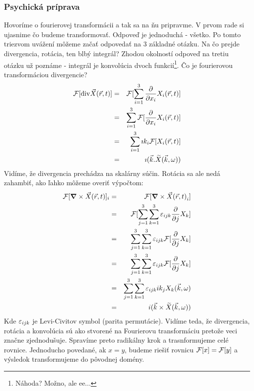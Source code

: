 \subsubsection{Psychická príprava}
Hovoríme o fourierovej transformácii a tak sa na ňu pripravme. V prvom
rade si ujasnime čo budeme transformovať. Odpoveď je jednoduchá -
všetko. Po tomto triezvom uvážení môžeme začať odpovedať na 3 základné
otázku. Na čo prejde divergencia, rotácia, ten blbý integrál? Zhodou
okolností odpoveď na tretiu otázku už poznáme - integrál je konvolúcia
dvoch funkcií\footnote{Náhoda? Možno, ale ee...}. Čo je fourierovou
transformáciou divergencie?
\begin{eqnarray}
    \mathcal{F}[{\rm div}{\vec{X}{(\vec{r},t)}}] &=& \mathcal{F}[\sum_{i=1}^3 \frac{\partial }{\partial x_i}
    X_i{(\vec{r},t)}] \\
    &=& \sum_{i=1}^3 \mathcal{F}[ \frac{\partial }{\partial x_i} X_i{(\vec{r},t)}]  \\
    &=& \sum_{i=1}^3 \imath k_i \mathcal{F}[X_i{(\vec{r},t)}] \\
    &=& \imath ( \vec{k} . \widetilde{X} {(\vec{k},\omega)})
\end{eqnarray}
Vidíme, že divergencia prechádza na skalárny súčin. Rotácia sa ale
nedá zahambiť, ako ľahko môžeme overiť výpočtom:
\begin{eqnarray}
    \mathcal{F}[\mbox{\boldmath$ \nabla $} \times \vec{X}{(\vec{r},t)}]_i &=& 
    \mathcal{F}[\mbox{\boldmath$ \nabla $} \times \vec{X}{(\vec{r},t)}_i] \\
    &=& \mathcal{F}[\sum_{j=1}^3 \sum_{k=1}^3 \varepsilon_{ijk} \frac{\partial }{\partial j} X_k] \\
    &=& \sum_{j=1}^3 \sum_{k=1}^3 \varepsilon_{ijk} \mathcal{F}[\frac{\partial }{\partial j} X_k] \\
    &=& \sum_{j=1}^3 \sum_{k=1}^3 \varepsilon_{ijk} \mathcal{F}[\frac{\partial }{\partial j} X_k] \\
    &=& \sum_{j=1}^3 \sum_{k=1}^3 \varepsilon_{ijk} i k_j X_k{(\vec{k},\omega)} \\
    &=& i ( \vec{k} \times \widetilde{X}{(\vec{k},\omega)} )
\end{eqnarray} 
Kde $\varepsilon_{ijk}$ je Levi-Civitov symbol (parita permutácie).
Vidíme teda, že divergencia, rotácia a konvolúcia sú ako stvorené na
Fourierovu transformáciu pretože veci značne zjednodušuje. Spravíme
preto radikálny krok a trasnformujeme celé rovnice. Jednoducho
povedané, ak $x=y$, budeme riešiť rovnicu $\mathcal{F}[x]=\mathcal{F}[y]$ a
výsledok transformujeme do pôvodnej domény.

